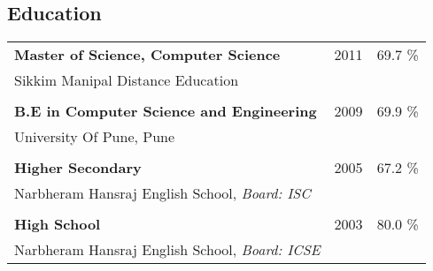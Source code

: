 \documentclass[letterpaper,margin,line]{RES}
\begin{document}
\begin{resume}
\section{\sc Education}
\begin{tabular}{@{}p{4in}p{.75in}p{.75in}}
{\bf Master of Science, Computer Science }              &  2011 &  69.7 \%  \\
Sikkim Manipal Distance Education                       &       & \\        \hline \\ 
{\bf B.E in Computer Science and Engineering }          &  2009 &  69.9 \%     \\
University Of Pune, Pune                                &       & \\ \hline \\ 
{\bf Higher Secondary }                                 &  2005 &  67.2 \%   \\       
Narbheram Hansraj English School, \it Board: ISC        &       &       
\\ \hline     \\
{\bf High School }                                      &  2003 &  80.0 \%   \\    
Narbheram Hansraj English School, \it Board: ICSE                       &       &            \\
\end{tabular}

\end{resume}
\end{document}
